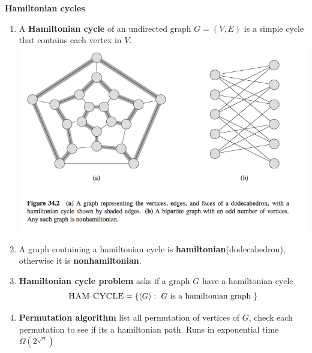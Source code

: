 \documentclass[11pt]{article}
\begin{document}
\begin{defn*}
    \textbf{Hamiltonian cycles} 
    \begin{enumerate}
        \item A \textbf{Hamiltonian cycle} of an undirected graph $G = (V,E)$ is a simple cycle that contains each vertex in $V$. \\
        \includegraphics[width=\textwidth]{hamiltonian}
        \item A graph containing a hamiltonian cycle is \textbf{hamiltonian}(dodecahedron), otherwise it is \textbf{nonhamiltonian}. 
        \item \textbf{Hamiltonian cycle problem} asks if a graph $G$ have a hamiltonian cycle
        \[
            \textsc{HAM-CYCLE} = \{ \langle G \rangle: \text{ $G$ is a hamiltonian graph } \}
        \]
        \item \textbf{Permutation algorithm} list all permutation of vertices of $G$, check each permutation to see if its a hamiltonian path. Runs in exponential time $\Omega(2^{\sqrt{n}})$
    \end{enumerate}
\end{defn*}
\end{document}
